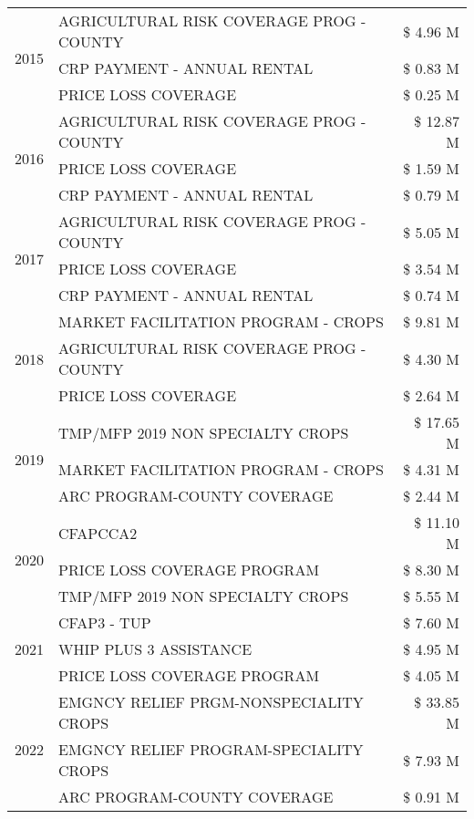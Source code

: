 \begin{tabular}{llr}
\multirow[t]{3}{*}{2015} & AGRICULTURAL RISK COVERAGE PROG - COUNTY & \$ 4.96 M \\
 & CRP PAYMENT - ANNUAL RENTAL & \$ 0.83 M \\
 & PRICE LOSS COVERAGE & \$ 0.25 M \\
\cline{1-3}
\multirow[t]{3}{*}{2016} & AGRICULTURAL RISK COVERAGE PROG - COUNTY & \$ 12.87 M \\
 & PRICE LOSS COVERAGE & \$ 1.59 M \\
 & CRP PAYMENT - ANNUAL RENTAL & \$ 0.79 M \\
\cline{1-3}
\multirow[t]{3}{*}{2017} & AGRICULTURAL RISK COVERAGE PROG - COUNTY & \$ 5.05 M \\
 & PRICE LOSS COVERAGE & \$ 3.54 M \\
 & CRP PAYMENT - ANNUAL RENTAL & \$ 0.74 M \\
\cline{1-3}
\multirow[t]{3}{*}{2018} & MARKET FACILITATION PROGRAM - CROPS & \$ 9.81 M \\
 & AGRICULTURAL RISK COVERAGE PROG - COUNTY & \$ 4.30 M \\
 & PRICE LOSS COVERAGE & \$ 2.64 M \\
\cline{1-3}
\multirow[t]{3}{*}{2019} & TMP/MFP 2019 NON SPECIALTY CROPS & \$ 17.65 M \\
 & MARKET FACILITATION PROGRAM - CROPS & \$ 4.31 M \\
 & ARC PROGRAM-COUNTY COVERAGE & \$ 2.44 M \\
\cline{1-3}
\multirow[t]{3}{*}{2020} & CFAPCCA2 & \$ 11.10 M \\
 & PRICE LOSS COVERAGE PROGRAM & \$ 8.30 M \\
 & TMP/MFP 2019 NON SPECIALTY CROPS & \$ 5.55 M \\
\cline{1-3}
\multirow[t]{3}{*}{2021} & CFAP3 - TUP & \$ 7.60 M \\
 & WHIP PLUS 3 ASSISTANCE & \$ 4.95 M \\
 & PRICE LOSS COVERAGE PROGRAM & \$ 4.05 M \\
\cline{1-3}
\multirow[t]{3}{*}{2022} & EMGNCY RELIEF PRGM-NONSPECIALITY CROPS & \$ 33.85 M \\
 & EMGNCY RELIEF PROGRAM-SPECIALITY CROPS & \$ 7.93 M \\
 & ARC PROGRAM-COUNTY COVERAGE & \$ 0.91 M \\
\cline{1-3}
\bottomrule
\end{tabular}
